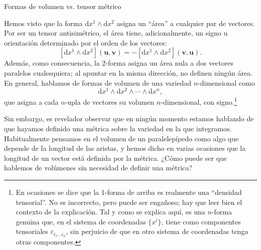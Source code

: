 \begin{observation}
    {Formas de volumen vs. tensor métrico
    \label{obs.3-integral}}

    Hemos visto que la forma \(\mathrm{d}x^1\wedge\mathrm{d}x^2\) asigna un ``área'' a cualquier par de vectores. Por ser un tensor antisimétrico, el área tiene, adicionalmente, un signo u orientación determinado por el orden de los vectores:
    \begin{equation*}
        \left[\mathrm{d}x^1\wedge\mathrm{d}x^2\right](\mathbf{u},\mathbf{v}) = -\left[\mathrm{d}x^1\wedge\mathrm{d}x^2\right](\mathbf{v},\mathbf{u}).
    \end{equation*}
    Además, como consecuencia, la 2-forma asigna un área nula a dos vectores paralelos cualesquiera; al apuntar en la misma dirección, no definen ningún área. En general, hablamos de formas de volumen de una variedad \(n\)-dimensional como
    \begin{equation*}
        \mathrm{d}x^1\wedge\mathrm{d}x^2\wedge\cdots\wedge\mathrm{d}x^n,
    \end{equation*}
    que asigna a cada \(n\)-upla de vectores su volumen \(n\)-dimensional, con signo.\footnote{En ocasiones se dice que la 1-forma de arriba es realmente una ``densidad tensorial''. No es incorrecto, pero puede ser engañoso; hay que leer bien el contexto de la explicación. Tal y como se explica aquí, es una \(n\)-forma genuina que, en el sistema de coordenadas \(\{x^i\}\), tiene como componentes tensoriales \(\varepsilon_{i_1...i_n}\), sin perjuicio de que en otro sistema de coordenadas tenga otras componentes.}

    Sin embargo, es revelador observar que en ningún momento estamos hablando de que hayamos definido una métrica sobre la variedad en la que integramos. Habitualmente pensamos en el volumen de un paralelepípedo como algo que depende de la longitud de las aristas, y hemos dicho en varias ocasiones que la longitud de un vector está definida por la métrica. ¿Cómo puede ser que hablemos de volúmenes sin necesidad de definir una métrica? 


\end{observation}

